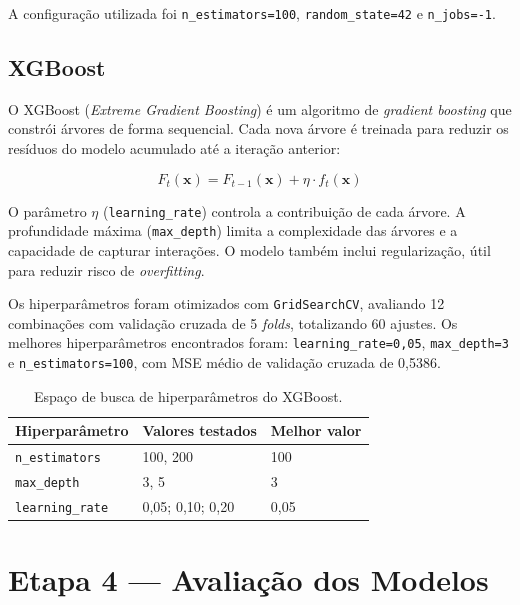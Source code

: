 \documentclass[conference]{IEEEtran}
\newcommand{\fonte}[1][elaborado pelos autores.]{%
\par\vspace{1pt}{\footnotesize\centering Fonte: #1\par}}
\begin{document}
A configuração utilizada foi \texttt{n_estimators=100},
\texttt{random_state=42} e \texttt{n_jobs=-1}.

\subsection{XGBoost}

O XGBoost (\textit{Extreme Gradient Boosting}) \cite{chen2016,xgboost_lib} é um
algoritmo de \textit{gradient boosting} que constrói árvores de forma
sequencial. Cada nova árvore é treinada para reduzir os resíduos do modelo
acumulado até a iteração anterior:

\begin{equation}
F_t(\mathbf{x}) = F_{t-1}(\mathbf{x}) + \eta \cdot f_t(\mathbf{x})
\end{equation}

O parâmetro $\eta$ (\texttt{learning_rate}) controla a contribuição de cada
árvore. A profundidade máxima (\texttt{max_depth}) limita a complexidade
das árvores e a capacidade de capturar interações. O modelo também inclui
regularização, útil para reduzir risco de \textit{overfitting}.

Os hiperparâmetros foram otimizados com \texttt{GridSearchCV}, avaliando
12 combinações com validação cruzada de 5 \textit{folds}, totalizando
60 ajustes. Os melhores hiperparâmetros encontrados foram:
\texttt{learning_rate=0,05}, \texttt{max_depth=3} e
\texttt{n_estimators=100}, com MSE médio de validação cruzada de 0,5386.

\begin{table}[H]
\centering
\small
\setlength{\tabcolsep}{4pt}
\caption{Espaço de busca de hiperparâmetros do XGBoost.}
\label{tab:xgb_grid}
\begin{tabular}{lll}
\toprule
\textbf{Hiperparâmetro} & \textbf{Valores testados} & \textbf{Melhor valor} \\
\midrule
\texttt{n_estimators}  & 100, 200                  & 100                   \\
\texttt{max_depth}     & 3, 5                      & 3                     \\
\texttt{learning_rate} & 0,05; 0,10; 0,20          & 0,05                  \\
\bottomrule
\end{tabular}
\fonte
\end{table}

\section{Etapa 4 — Avaliação dos Modelos}
\label{sec:eval}
\end{document}
